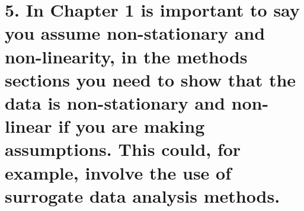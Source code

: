 \documentclass[12pt]{article}
\begin{document}
\section*{5.  
In Chapter 1 is important to say you assume non-stationary and non-linearity,
in the methods sections you need to show that the data is non-stationary 
and non-linear if you are making assumptions. 
This could, for example, involve the use of surrogate data analysis
methods.
}







%
%








%

\end{document}
